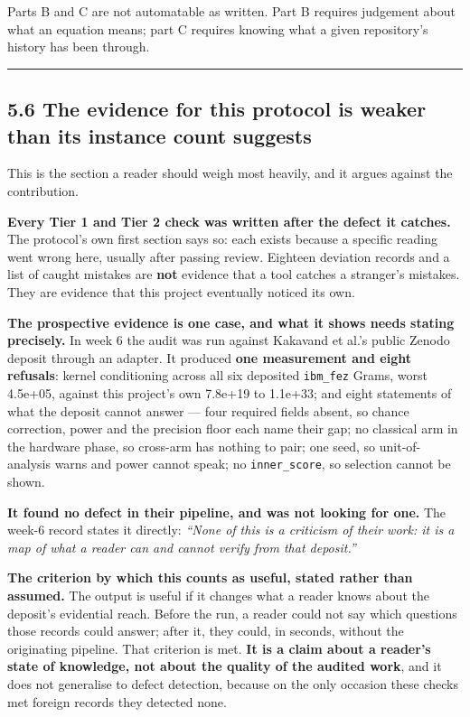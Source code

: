 \documentclass[
  10pt,
]{article}
\newcounter{none} %
\begin{document}
Parts B and C are not automatable as written. Part B requires judgement
about what an equation means; part C requires knowing what a given
repository's history has been through.

\begin{center}\rule{0.5\linewidth}{0.5pt}\end{center}

\subsection{5.6 The evidence for this protocol is weaker than its
instance count
suggests}\label{the-evidence-for-this-protocol-is-weaker-than-its-instance-count-suggests}

This is the section a reader should weigh most heavily, and it argues
against the contribution.

\textbf{Every Tier 1 and Tier 2 check was written after the defect it
catches.} The protocol's own first section says so: each exists because
a specific reading went wrong here, usually after passing review.
Eighteen deviation records and a list of caught mistakes are
\textbf{not} evidence that a tool catches a stranger's mistakes. They
are evidence that this project eventually noticed its own.

\textbf{The prospective evidence is one case, and what it shows needs
stating precisely.} In week 6 the audit was run against Kakavand et
al.'s public Zenodo deposit through an adapter. It produced \textbf{one
measurement and eight refusals}: kernel conditioning across all six
deposited \texttt{ibm\_\allowbreak{}fez} Grams, worst 4.5e+05, against this project's
own 7.8e+19 to 1.1e+33; and eight statements of what the deposit cannot
answer --- four required fields absent, so chance correction, power and
the precision floor each name their gap; no classical arm in the
hardware phase, so cross-arm has nothing to pair; one seed, so
unit-of-analysis warns and power cannot speak; no \texttt{inner\_\allowbreak{}score},
so selection cannot be shown.

\textbf{It found no defect in their pipeline, and was not looking for
one.} The week-6 record states it directly: \emph{``None of this is a
criticism of their work: it is a map of what a reader can and cannot
verify from that deposit.''}

\textbf{The criterion by which this counts as useful, stated rather than
assumed.} The output is useful if it changes what a reader knows about
the deposit's evidential reach. Before the run, a reader could not say
which questions those records could answer; after it, they could, in
seconds, without the originating pipeline. That criterion is met.
\textbf{It is a claim about a reader's state of knowledge, not about the
quality of the audited work}, and it does not generalise to defect
detection, because on the only occasion these checks met foreign records
they detected none.
\end{document}
